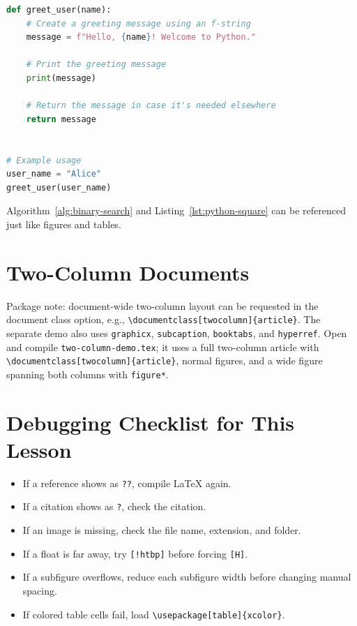 \documentclass[11pt,a4paper]{article}
\begin{document}
\begin{lstlisting}[language=Python, caption={A small Python function.}, label={lst:python-square}]
def greet_user(name):
    # Create a greeting message using an f-string
    message = f"Hello, {name}! Welcome to Python."

    # Print the greeting message
    print(message)

    # Return the message in case it's needed elsewhere
    return message


# Example usage
user_name = "Alice"
greet_user(user_name)
\end{lstlisting}

Algorithm~\ref{alg:binary-search} and Listing~\ref{lst:python-square} can be
referenced just like figures and tables.

\section{Two-Column Documents}

Package note: document-wide two-column layout can be requested in the document
class option, e.g., \verb|\documentclass[twocolumn]{article}|. The separate
demo also uses \texttt{graphicx}, \texttt{subcaption}, \texttt{booktabs}, and
\texttt{hyperref}. Open and compile \texttt{two-column-demo.tex}; it uses a
full two-column article with \verb|\documentclass[twocolumn]{article}|, normal
figures, and a wide figure spanning both columns with \texttt{figure*}.

\section{Debugging Checklist for This Lesson}

\begin{itemize}
    \item If a reference shows as \texttt{??}, compile LaTeX again.
    \item If a citation shows as \texttt{?}, check the citation.
    \item If an image is missing, check the file name, extension, and folder.
    \item If a float is far away, try \verb|[!htbp]| before forcing \verb|[H]|.
    \item If a subfigure overflows, reduce each subfigure width before changing
    manual spacing.
    \item If colored table cells fail, load \verb|\usepackage[table]{xcolor}|.
\end{itemize}



\end{document}
